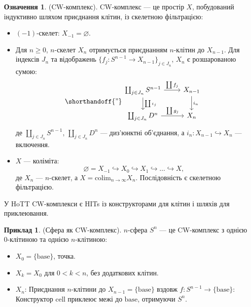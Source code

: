 \documentclass{article}
\theoremstyle{definition}
\newtheorem{definition}{Означення}
\newtheorem{example}{Приклад}
\newcommand*{\incmap}{\hookrightarrow}
\begin{document}
\begin{definition} (CW-комплекс).
CW-комплекс — це простір \( X \), побудований індуктивно шляхом приєднання клітин, із скелетною фільтрацією:
\begin{itemize}
    \item \((-1)\)-скелет: \( X_{-1} = \varnothing \).
    \item Для \( n \geq 0 \), \( n \)-скелет \( X_n \) отримується приєднанням \( n \)-клітин до \( X_{n-1} \). Для
      індексів \( J_n \) та відображень \( \{ f_j : S^{n-1} \to X_{n-1}
      \}_{j \in J_n} \), \( X_n \) є розшарованою сумою:
    \[
    \shorthandoff{"}
    \begin{tikzcd}
    \coprod_{j \in J_n} S^{n-1} \arrow[r, "\coprod f_j"] \arrow[d, "\coprod \iota_j"] & X_{n-1} \arrow[d, "i_n"] \\
    \coprod_{j \in J_n} D^n \arrow[r, "\coprod g_j"] & X_n
    \end{tikzcd}
    \]
    де \( \coprod_{j \in J_n} S^{n-1} \), \( \coprod_{j \in
    J_n} D^n \) — диз’юнктні об’єднання, а \( i_n : X_{n-1}
    \incmap X_n \) — включення.
    \item \( X \) — коліміта:
    \[
    \varnothing = X_{-1} \incmap X_0 \incmap X_1 \incmap \dots
    \incmap X,
    \]
    де \( X_n \) — \( n \)-скелет, а \( X = \text{colim}_{n
    \to \infty} X_n \). Послідовність є скелетною фільтрацією.
\end{itemize}
У HoTT CW-комплекси є HITs із конструкторами для клітин і
шляхів для приклеювання.
\end{definition}

\begin{example} (Сфера як CW-комплекс).
\( n \)-сфера \( S^n \) — це CW-комплекс з однією 0-клітиною та однією \( n \)-клітиною:
\begin{itemize}
    \item \( X_0 = \{ \text{base} \} \), точка.
    \item \( X_k = X_0 \) для \( 0 < k < n \), без додаткових клітин.
    \item \( X_n \): Приєднання \( n \)-клітини до \( X_{n-1} =
      \{ \text{base} \} \) вздовж \( f : S^{n-1} \to
      \{ \text{base} \} \):
    Конструктор \(\text{cell}\) приклеює межі до
    \( \text{base} \), отримуючи \( S^n \).
\end{itemize}
\end{example}
\end{document}
